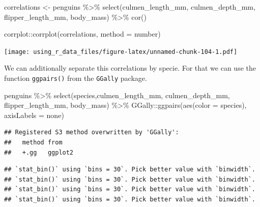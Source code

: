 \documentclass[
]{book}
\newenvironment{Shaded}{\begin{snugshade}}{\end{snugshade}}
\newcommand{\AttributeTok}[1]{\textcolor[rgb]{0.77,0.63,0.00}{#1}}
\newcommand{\FunctionTok}[1]{\textcolor[rgb]{0.00,0.00,0.00}{#1}}
\newcommand{\NormalTok}[1]{#1}
\newcommand{\OtherTok}[1]{\textcolor[rgb]{0.56,0.35,0.01}{#1}}
\newcommand{\SpecialCharTok}[1]{\textcolor[rgb]{0.00,0.00,0.00}{#1}}
\newcommand{\StringTok}[1]{\textcolor[rgb]{0.31,0.60,0.02}{#1}}
\begin{document}
\begin{Shaded}
\begin{Highlighting}[]
\NormalTok{correlations }\OtherTok{\textless{}{-}}\NormalTok{ penguins }\SpecialCharTok{\%\textgreater{}\%} 
  \FunctionTok{select}\NormalTok{(}\StringTok{\textquotesingle{}culmen\_length\_mm\textquotesingle{}}\NormalTok{, }\StringTok{\textquotesingle{}culmen\_depth\_mm\textquotesingle{}}\NormalTok{, }\StringTok{\textquotesingle{}flipper\_length\_mm\textquotesingle{}}\NormalTok{, }\StringTok{\textquotesingle{}body\_mass\textquotesingle{}}\NormalTok{) }\SpecialCharTok{\%\textgreater{}\%} 
  \FunctionTok{cor}\NormalTok{()}

\NormalTok{corrplot}\SpecialCharTok{::}\FunctionTok{corrplot}\NormalTok{(correlations, }\AttributeTok{method =} \StringTok{\textquotesingle{}number\textquotesingle{}}\NormalTok{)}
\end{Highlighting}
\end{Shaded}

\texttt{[image: using\_r\_data\_files/figure-latex/unnamed-chunk-104-1.pdf]}

We can additionally separate this correlations by specie.
For that we can use the function \texttt{ggpairs()} from the \texttt{GGally} package.

\begin{Shaded}
\begin{Highlighting}[]
\NormalTok{penguins }\SpecialCharTok{\%\textgreater{}\%} 
  \FunctionTok{select}\NormalTok{(}\StringTok{\textquotesingle{}species\textquotesingle{}}\NormalTok{,}\StringTok{\textquotesingle{}culmen\_length\_mm\textquotesingle{}}\NormalTok{, }\StringTok{\textquotesingle{}culmen\_depth\_mm\textquotesingle{}}\NormalTok{, }\StringTok{\textquotesingle{}flipper\_length\_mm\textquotesingle{}}\NormalTok{, }\StringTok{\textquotesingle{}body\_mass\textquotesingle{}}\NormalTok{) }\SpecialCharTok{\%\textgreater{}\%} 
\NormalTok{  GGally}\SpecialCharTok{::}\FunctionTok{ggpairs}\NormalTok{(}\FunctionTok{aes}\NormalTok{(}\AttributeTok{color =}\NormalTok{ species), }\AttributeTok{axisLabels =} \StringTok{\textquotesingle{}none\textquotesingle{}}\NormalTok{)}
\end{Highlighting}
\end{Shaded}

\begin{verbatim}
## Registered S3 method overwritten by 'GGally':
##   method from   
##   +.gg   ggplot2
\end{verbatim}

\begin{verbatim}
## `stat_bin()` using `bins = 30`. Pick better value with `binwidth`.
## `stat_bin()` using `bins = 30`. Pick better value with `binwidth`.
## `stat_bin()` using `bins = 30`. Pick better value with `binwidth`.
## `stat_bin()` using `bins = 30`. Pick better value with `binwidth`.
\end{verbatim}
\end{document}
